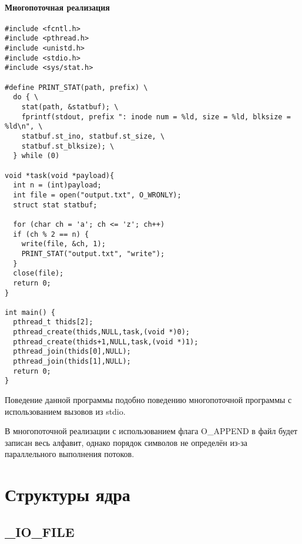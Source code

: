 \subsubsection{Многопоточная реализация}
\begin{lstlisting}
#include <fcntl.h>
#include <pthread.h>
#include <unistd.h>
#include <stdio.h>
#include <sys/stat.h>

#define PRINT_STAT(path, prefix) \
  do { \
    stat(path, &statbuf); \
    fprintf(stdout, prefix ": inode num = %ld, size = %ld, blksize = %ld\n", \
    statbuf.st_ino, statbuf.st_size, \
    statbuf.st_blksize); \
  } while (0)

void *task(void *payload){
  int n = (int)payload;
  int file = open("output.txt", O_WRONLY);
  struct stat statbuf;

  for (char ch = 'a'; ch <= 'z'; ch++)
  if (ch % 2 == n) {
    write(file, &ch, 1);
    PRINT_STAT("output.txt", "write");
  }
  close(file);
  return 0;
}

int main() {
  pthread_t thids[2];
  pthread_create(thids,NULL,task,(void *)0);
  pthread_create(thids+1,NULL,task,(void *)1);
  pthread_join(thids[0],NULL);
  pthread_join(thids[1],NULL);
  return 0;
}
\end{lstlisting}

Поведение данной программы подобно поведению
многопоточной программы с использованием вызовов из stdio.


В многопоточной реализации с использованием флага O\_APPEND
в файл будет записан весь алфавит, однако порядок символов не определён из-за
параллельного выполнения потоков.

\chapter{Структуры ядра}

\section{\_IO\_FILE}

